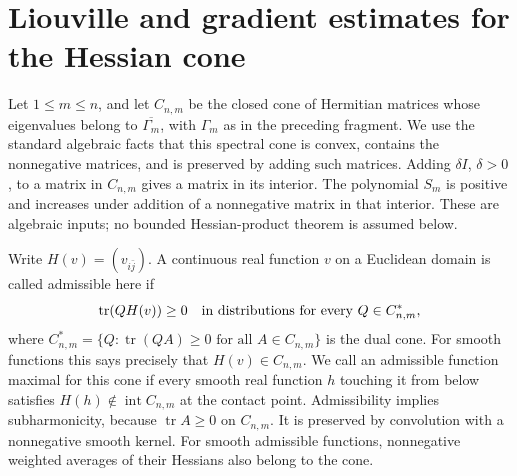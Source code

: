 \section{Liouville and gradient estimates for the Hessian cone}

Let $1\leq m\leq n$, and let $C_{n,m}$ be the closed cone of Hermitian matrices whose eigenvalues belong to $\overline{\Gamma_m}$, with $\Gamma_m$ as in the preceding fragment.
We use the standard algebraic facts that this spectral cone is convex, contains the nonnegative matrices, and is preserved by adding such matrices. Adding $\delta I$, $\delta>0$, to a matrix in $C_{n,m}$ gives a matrix in its interior. The polynomial $S_m$ is positive and increases under addition of a nonnegative matrix in that interior. These are algebraic inputs; no bounded Hessian-product theorem is assumed below.

Write $H(v)=(v_{i\bar j})$. A continuous real function $v$ on a Euclidean domain is called admissible here if
\[
 \operatorname{tr}(QH(v))\geq0
 \quad\hbox{in distributions for every }Q\in C_{n,m}^*,
\]
where $C_{n,m}^*=\{Q:\operatorname{tr}(QA)\geq0\text{ for all }A\in C_{n,m}\}$ is the dual cone.
For smooth functions this says precisely that $H(v)\in C_{n,m}$.
We call an admissible function maximal for this cone if every smooth real function $h$ touching it from below satisfies $H(h)\notin\operatorname{int}C_{n,m}$ at the contact point.
Admissibility implies subharmonicity, because $\operatorname{tr}A\geq0$ on $C_{n,m}$. It is preserved by convolution with a nonnegative smooth kernel. For smooth admissible functions, nonnegative weighted averages of their Hessians also belong to the cone.

